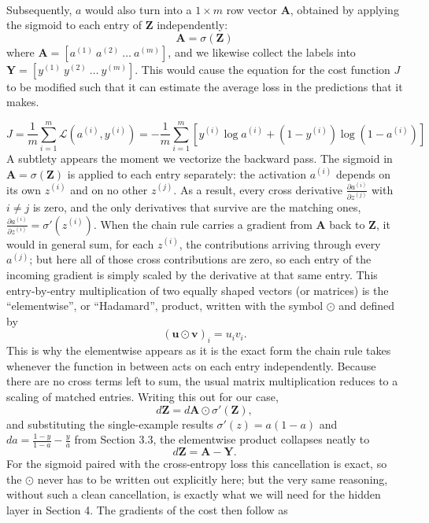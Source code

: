 \documentclass{article}
\begin{document}
\\
Subsequently, $a$ would also turn into a $1 \times m$ row vector $\mathbf{A}$, obtained by applying the sigmoid to each entry of $\mathbf{Z}$ independently:
\begin{equation}
    \mathbf{A}=\sigma(\mathbf{Z})
\end{equation}
where $\mathbf{A}=[a^{(1)}\ a^{(2)}\ \dots\ a^{(m)}]$, and we likewise collect the labels into $\mathbf{Y}=[y^{(1)}\ y^{(2)}\ \dots\ y^{(m)}]$. This would cause the equation for the cost function $J$ to be modified such that it can estimate the average loss in the predictions that it makes.

\begin{equation}
    J=\frac{1}{m} \sum_{i=1}^{m}\mathcal{L}(a^{(i)},y^{(i)}) = -\frac{1}{m} \sum_{i=1}^{m}[y^{(i)}\log a^{(i)} + (1-y^{(i)})\log{(1-a^{(i)})}]
\end{equation}
A subtlety appears the moment we vectorize the backward pass. The sigmoid in $\mathbf{A} = \sigma(\mathbf{Z})$ is applied to each entry separately: the activation $a^{(i)}$ depends on its own $z^{(i)}$ and on no other $z^{(j)}$. As a result, every cross derivative $\frac{\partial a^{(i)}}{\partial z^{(j)}}$ with $i \neq j$ is zero, and the only derivatives that survive are the matching ones, $\frac{\partial a^{(i)}}{\partial z^{(i)}} = \sigma'(z^{(i)})$. When the chain rule carries a gradient from $\mathbf{A}$ back to $\mathbf{Z}$, it would in general sum, for each $z^{(i)}$, the contributions arriving through every $a^{(j)}$; but here all of those cross contributions are zero, so each entry of the incoming gradient is simply scaled by the derivative at that same entry. This entry-by-entry multiplication of two equally shaped vectors (or matrices) is the ``elementwise'', or ``Hadamard'', product, written with the symbol $\odot$ and defined by
$$(\mathbf{u} \odot \mathbf{v})_i = u_i v_i.$$
This is why the elementwise appears as it is the exact form the chain rule takes whenever the function in between acts on each entry independently. Because there are no cross terms left to sum, the usual matrix multiplication reduces to a scaling of matched entries. Writing this out for our case,
$$d\mathbf{Z} = d\mathbf{A} \odot \sigma'(\mathbf{Z}),$$
and substituting the single-example results $\sigma'(z) = a(1-a)$ and $da = \frac{1-y}{1-a} - \frac{y}{a}$ from Section 3.3, the elementwise product collapses neatly to
$$d\mathbf{Z} = \mathbf{A} - \mathbf{Y}.$$
For the sigmoid paired with the cross-entropy loss this cancellation is exact, so the $\odot$ never has to be written out explicitly here; but the very same reasoning, without such a clean cancellation, is exactly what we will need for the hidden layer in Section 4. The gradients of the cost then follow as
\end{document}
